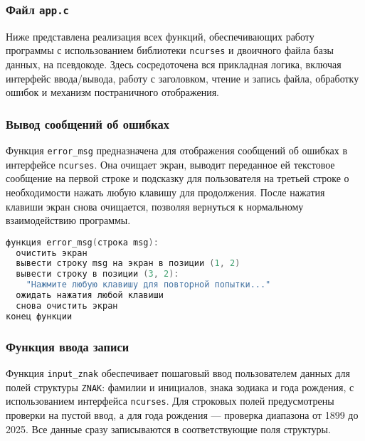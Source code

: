 \subsubsection*{Файл \texttt{app.c}}

Ниже представлена реализация всех функций, обеспечивающих работу программы с использованием библиотеки \texttt{ncurses} и двоичного файла базы данных, на псевдокоде. Здесь сосредоточена вся прикладная логика, включая интерфейс ввода/вывода, работу с заголовком, чтение и запись файла, обработку ошибок и механизм постраничного отображения.

\subsubsection*{Вывод сообщений об ошибках}

Функция \texttt{error\_msg} предназначена для отображения сообщений об ошибках в интерфейсе \texttt{ncurses}. Она очищает экран, выводит переданное ей текстовое сообщение на первой строке и подсказку для пользователя на третьей строке о необходимости нажать любую клавишу для продолжения. После нажатия клавиши экран снова очищается, позволяя вернуться к нормальному взаимодействию программы.

\begin{lstlisting}[language=C, caption=Функция error\_msg]
функция error_msg(строка msg):
  очистить экран
  вывести строку msg на экран в позиции (1, 2)
  вывести строку в позиции (3, 2):
    "Нажмите любую клавишу для повторной попытки..."
  ожидать нажатия любой клавиши
  снова очистить экран
конец функции
\end{lstlisting}

\subsubsection*{Функция ввода записи}

Функция \texttt{input\_znak} обеспечивает пошаговый ввод пользователем данных для полей структуры \texttt{ZNAK}: фамилии и инициалов, знака зодиака и года рождения, с использованием интерфейса \texttt{ncurses}. Для строковых полей предусмотрены проверки на пустой ввод, а для года рождения — проверка диапазона от 1899 до 2025. Все данные сразу записываются в соответствующие поля структуры.

